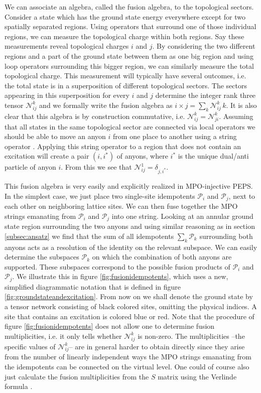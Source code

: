 \documentclass[12 pt]{article}
\begin{document}
We can associate an algebra, called the fusion algebra, to the topological sectors. Consider a state which has the ground state energy everywhere except for two spatially separated regions. Using operators that surround one of those individual regions, we can measure the topological charge within both regions. Say these measurements reveal topological charges $i$ and $j$. By considering the two different regions and a part of the ground state between them as one big region and using loop operators surrounding this bigger region, we can similarly measure the total topological charge. This measurement will typically have several outcomes, i.e. the total state is in a superposition of different topological sectors. The sectors appearing in this superposition for every $i$ and $j$ determine the integer rank three tensor $\mathscr{N}_{ij}^k$ and we formally write the fusion algebra as $i\times j = \sum_{k}\mathscr{N}_{ij}^k\,k$. It is also clear that this algebra is by construction commutative, i.e. $\mathscr{N}_{ij}^k = \mathscr{N}_{ji}^k$. Assuming that all states in the same topological sector are connected via local operators we should be able to move an anyon $i$ from one place to another using a string operator \cite{ReadChakraborty,Kitaev03,Kitaev06,LevinWen05}. Applying this string operator to a region that does not contain an excitation will create a pair $(i,i^*)$ of anyons, where $i^*$ is the unique dual/anti particle of anyon $i$. From this we see that $\mathscr{N}_{ij}^1 = \delta_{j,i^*}$.

This fusion algebra is very easily and explicitly realized in MPO-injective PEPS. In the simplest case, we just place two single-site idempotents $\mathcal{P}_i$ and $\mathcal{P}_j$, next to each other on neighboring lattice sites. We can then fuse together the MPO strings emanating from $\mathcal{P}_i$ and $\mathcal{P}_j$ into one string. Looking at an annular ground state region surrounding the two anyons and using similar reasoning as in section \ref{subsec:ansatz} we find that the sum of all idempotents $\sum_k \mathcal{P}_k$ surrounding both anyons acts as a resolution of the identity on the relevant subspace. We can easily determine the subspaces $\mathcal{P}_k$ on which the combination of both anyons are supported. These subspaces correspond to the possible fusion products of $\mathcal{P}_i$ and $\mathcal{P}_j$. We illustrate this in figure \ref{fig:fusionidempotents}, which uses a new, simplified diagrammatic notation that is defined in figure \ref{fig:groundstateandexcitation}. From now on we shall denote the ground state by a tensor network consisting of black colored sites, omitting the physical indices. A site that contains an excitation is colored blue or red. Note that the procedure of figure \ref{fig:fusionidempotents} does not allow one to determine fusion multiplicities, i.e. it only tells whether $\mathscr{N}_{ij}^k$ is non-zero. The multiplicities --the specific values of $\mathscr{N}_{ij}^k$-- are in general harder to obtain directly since they arise from the number of linearly independent ways the MPO strings emanating from the idempotents can be connected on the virtual level. One could of course also just calculate the fusion multiplicities from the $S$ matrix using the Verlinde formula \cite{verlinde}.
\end{document}

